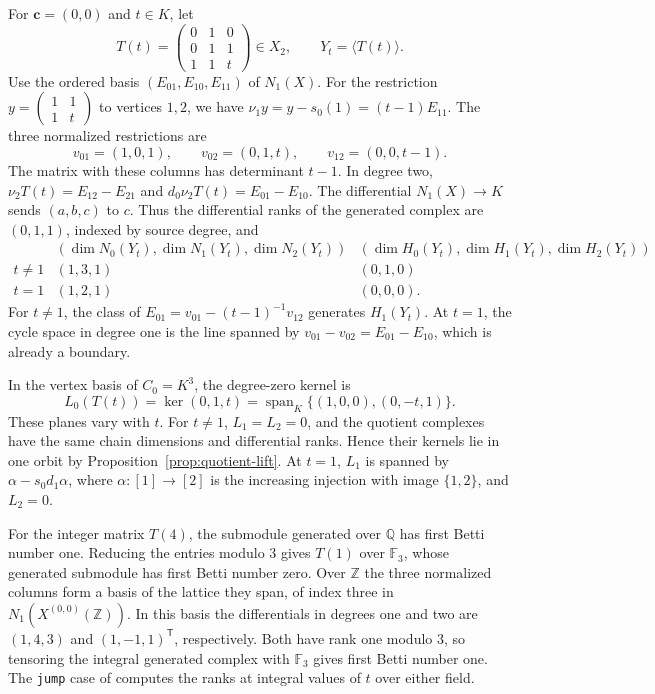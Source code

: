 \begin{example}\label{ex:parameter-jump}
For $\mathbf c=(0,0)$ and $t\in K$, let
\[
 T(t)=\begin{pmatrix}0&1&0\\0&1&1\\1&1&t\end{pmatrix}\in X_2,
 \qquad Y_t=\langle T(t)\rangle.
\]
Use the ordered basis $(E_{01},E_{10},E_{11})$ of $N_1(X)$.
For the restriction $y=\left(\begin{smallmatrix}1&1\\1&t\end{smallmatrix}\right)$
to vertices $1,2$, we have $\nu_1y=y-s_0(1)=(t-1)E_{11}$.
The three normalized restrictions are
\[
 v_{01}=(1,0,1),\qquad v_{02}=(0,1,t),\qquad
 v_{12}=(0,0,t-1).
\]
The matrix with these columns has determinant $t-1$. In degree two,
$\nu_2T(t)=E_{12}-E_{21}$ and $d_0\nu_2T(t)=E_{01}-E_{10}$.
The differential $N_1(X)\to K$ sends $(a,b,c)$ to $c$.
Thus the differential ranks of the generated complex are $(0,1,1)$,
indexed by source degree, and
\[
\begin{array}{c|c|c}
 &(\dim N_0(Y_t),\dim N_1(Y_t),\dim N_2(Y_t))&(\dim H_0(Y_t),\dim H_1(Y_t),\dim H_2(Y_t))\\ \hline
 t\ne1&(1,3,1)&(0,1,0)\\
 t=1&(1,2,1)&(0,0,0).
\end{array}
\]
For $t\ne1$, the class of $E_{01}=v_{01}-(t-1)^{-1}v_{12}$
generates $H_1(Y_t)$.
At $t=1$, the cycle space in degree one is the line spanned by
$v_{01}-v_{02}=E_{01}-E_{10}$, which is already a boundary.

In the vertex basis of $C_0=K^3$, the degree-zero kernel is
\[
 L_0(T(t))=\ker(0,1,t)
   =\operatorname{span}_K\{(1,0,0),(0,-t,1)\}.
\]
These planes vary with $t$. For $t\ne1$, $L_1=L_2=0$, and the quotient
complexes have the same chain dimensions and differential ranks. Hence their kernels
lie in one orbit by Proposition~\ref{prop:quotient-lift}. At $t=1$,
$L_1$ is spanned by $\alpha-s_0d_1\alpha$, where $\alpha:[1]\to[2]$
is the increasing injection with image $\{1,2\}$, and $L_2=0$.

For the integer matrix $T(4)$, the submodule generated over $\mathbb Q$ has
first Betti number one. Reducing the entries modulo $3$ gives $T(1)$ over
$\mathbb F_3$, whose generated submodule has first Betti number zero.
Over $\mathbb Z$ the three normalized columns form a basis of the lattice
they span, of index three in $N_1(X^{(0,0)}(\mathbb Z))$. In this basis
the differentials in degrees one and two are $(1,4,3)$ and
$(1,-1,1)^{\mathsf T}$, respectively. Both have rank one modulo $3$,
so tensoring the integral generated complex with $\mathbb F_3$ gives
first Betti number one.
The \texttt{jump} case of 
computes the ranks at integral values of $t$ over either field.
\end{example}

